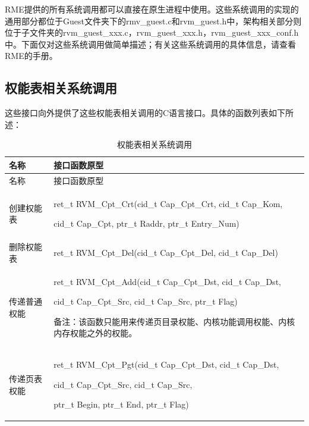 RME提供的所有系统调用都可以直接在原生进程中使用。这些系统调用的实现的通用部分都位于Guest文件夹下的rmv\_guest.c和rvm\_guest.h中，架构相关部分则位于子文件夹的rvm\_guest\_xxx.c，rvm\_guest\_xxx.h，rvm\_guest\_xxx\_conf.h中。下面仅对这些系统调用做简单描述；有关这些系统调用的具体信息，请查看RME的手册。

\subsection{权能表相关系统调用}\label{subsec:3-5-1}

这些接口向外提供了这些权能表相关调用的C语言接口。具体的函数列表如下所述：

\begin{xltabular}{\textwidth}{@{}>{\hsize\raggedright\arraybackslash}X>{\hsize\raggedright\arraybackslash}X@{}}
\caption{权能表相关系统调用}\label{tab:3-5}\\
\toprule
名称 & 接口函数原型\tabularnewline
\endfirsthead
\toprule
名称 & 接口函数原型\tabularnewline
\midrule
\endhead
\bottomrule
\endlastfoot
创建权能表\strut
 & ret\_\allowbreak{}t RVM\_\allowbreak{}Cpt\_\allowbreak{}Crt(cid\_\allowbreak{}t Cap\_\allowbreak{}Cpt\_\allowbreak{}Crt, cid\_\allowbreak{}t Cap\_\allowbreak{}Kom,

cid\_\allowbreak{}t Cap\_\allowbreak{}Cpt, ptr\_\allowbreak{}t Raddr, ptr\_\allowbreak{}t Entry\_\allowbreak{}Num)\strut
\tabularnewline
删除权能表 & ret\_\allowbreak{}t RVM\_\allowbreak{}Cpt\_\allowbreak{}Del(cid\_\allowbreak{}t Cap\_\allowbreak{}Cpt\_\allowbreak{}Del, cid\_\allowbreak{}t
Cap\_\allowbreak{}Del)\tabularnewline
传递普通权能\strut
 & ret\_\allowbreak{}t RVM\_\allowbreak{}Cpt\_\allowbreak{}Add(cid\_\allowbreak{}t Cap\_\allowbreak{}Cpt\_\allowbreak{}Dst, cid\_\allowbreak{}t Cap\_\allowbreak{}Dst,

cid\_\allowbreak{}t Cap\_\allowbreak{}Cpt\_\allowbreak{}Src, cid\_\allowbreak{}t Cap\_\allowbreak{}Src, ptr\_\allowbreak{}t Flag)

备注：该函数只能用来传递页目录权能、内核功能调用权能、内核内存权能之外的权能。\strut
\tabularnewline
传递页表权能\strut
 & ret\_\allowbreak{}t RVM\_\allowbreak{}Cpt\_\allowbreak{}Pgt(cid\_\allowbreak{}t Cap\_\allowbreak{}Cpt\_\allowbreak{}Dst, cid\_\allowbreak{}t Cap\_\allowbreak{}Dst,

cid\_\allowbreak{}t Cap\_\allowbreak{}Cpt\_\allowbreak{}Src, cid\_\allowbreak{}t Cap\_\allowbreak{}Src,

ptr\_\allowbreak{}t Begin, ptr\_\allowbreak{}t End, ptr\_\allowbreak{}t Flag)


\end{xltabular}
